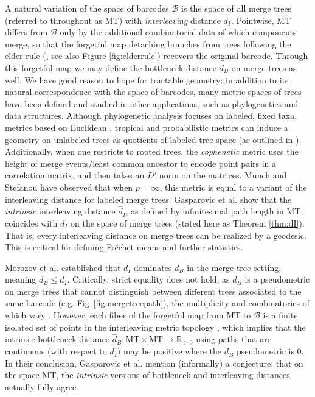 \documentclass{article}
\theoremstyle{definition}
\newcommand{\MT}{\mathrm{MT}}
\newcommand{\BC}{\mathcal{B}}
\begin{document}
A natural variation of the space of barcodes $\BC$ is the space of all merge trees (referred to throughout as $\MT$) with \emph{interleaving} distance $d_I$. Pointwise, $\MT$ differs from $\BC$ only by the additional combinatorial data of which components merge, so that the forgetful map detaching branches from trees following the elder rule (\cite{cai2021elder, curry2018fiber, edelsbrunner2010computational}, see also Figure \ref{fig:elderrule}) recovers the original barcode.
Through this forgetful map we may define the bottleneck distance $d_B$ on merge trees as well. We have good reason to hope for tractable geometry: in addition to its natural correspondence with the space of barcodes,
many metric spaces of trees have been defined and studied in other applications, such as phylogenetics and data structures. Although phylogenetic analysis focuses on labeled, fixed taxa, metrics based on Euclidean \cite{BHV}, tropical \cite{trop} and probabilistic metrics \cite{wald} can induce a geometry on unlabeled trees as quotients of labeled tree space (as outlined in  \cite{feragen_nye_2020}). Additionally, when one restricts to rooted trees, the \emph{cophenetic} metric uses the height of merge events/least common ancestor to encode point pairs in a correlation matrix, and then takes an $L^p$ norm on the matrices. Munch and Stefanou \cite{munch2019} have observed that when $p = \infty$, this metric is equal to a variant of the interleaving distance for labeled merge trees. Gasparovic et al. \cite{gasparovic2025intrinsic} show that the \emph{intrinsic} interleaving distance $\widehat{d}_I$, as defined by infinitesimal path length in $\MT$, coincides with $d_I$ on the space of merge trees (stated here as Theorem \ref{thm:dI}). That is, every interleaving distance on merge trees can be realized by a geodesic. This is critical for defining Fr\'{e}chet means and further statistics.

 Morozov et al. \cite{morozov2013interleaving} established that $d_I$ dominates $d_B$ in the merge-tree setting, meaning $d_B \leq d_I$. Critically, strict equality does not hold, as $d_B$ is a pseudometric on merge trees that cannot distinguish between different trees associated to the same barcode (e.g. Fig~\ref{fig:mergetreepath}), the multiplicity and combinatorics of which vary \cite{curry2024trees,beers2025fiber}. However, each fiber of the forgetful map from $\MT$ to $\BC$ is a finite isolated set of points in the interleaving metric topology \cite{curry2018fiber}, which implies that the intrinsic bottleneck distance $\widehat{d}_B:\MT\times\MT \to \mathbb{R}_{\geq 0}$ using paths that are continuous (with respect to $d_I$) may be positive where the $d_B$ pseudometric is 0.
In their conclusion, Gasparovic et al. mention (informally) a conjecture: that on the space $\MT$, the \emph{intrinsic} versions of bottleneck and interleaving distances actually fully agree. 
\end{document}
